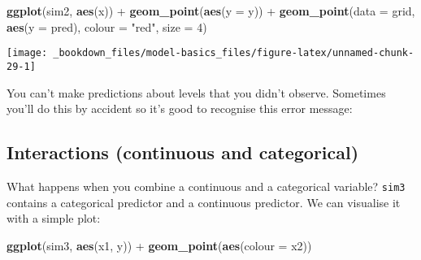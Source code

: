 \documentclass[]{book}
\newenvironment{Shaded}{\begin{snugshade}}{\end{snugshade}}
\newcommand{\KeywordTok}[1]{\textcolor[rgb]{0.13,0.29,0.53}{\textbf{{#1}}}}
\newcommand{\DataTypeTok}[1]{\textcolor[rgb]{0.13,0.29,0.53}{{#1}}}
\newcommand{\DecValTok}[1]{\textcolor[rgb]{0.00,0.00,0.81}{{#1}}}
\newcommand{\StringTok}[1]{\textcolor[rgb]{0.31,0.60,0.02}{{#1}}}
\newcommand{\CommentTok}[1]{\textcolor[rgb]{0.56,0.35,0.01}{\textit{{#1}}}}
\newcommand{\NormalTok}[1]{{#1}}
\begin{document}
\begin{Shaded}
\begin{Highlighting}[]
\KeywordTok{ggplot}\NormalTok{(sim2, }\KeywordTok{aes}\NormalTok{(x)) +}\StringTok{ }
\StringTok{  }\KeywordTok{geom_point}\NormalTok{(}\KeywordTok{aes}\NormalTok{(}\DataTypeTok{y =} \NormalTok{y)) +}
\StringTok{  }\KeywordTok{geom_point}\NormalTok{(}\DataTypeTok{data =} \NormalTok{grid, }\KeywordTok{aes}\NormalTok{(}\DataTypeTok{y =} \NormalTok{pred), }\DataTypeTok{colour =} \StringTok{"red"}\NormalTok{, }\DataTypeTok{size =} \DecValTok{4}\NormalTok{)}
\end{Highlighting}
\end{Shaded}

\begin{center}\texttt{[image: \_bookdown\_files/model-basics\_files/figure-latex/unnamed-chunk-29-1]} \end{center}

You can't make predictions about levels that you didn't observe.
Sometimes you'll do this by accident so it's good to recognise this
error message:

\begin{Shaded}
\end{Shaded}

\subsection{Interactions (continuous and
categorical)}\label{interactions-continuous-and-categorical}

What happens when you combine a continuous and a categorical variable?
\texttt{sim3} contains a categorical predictor and a continuous
predictor. We can visualise it with a simple plot:

\begin{Shaded}
\begin{Highlighting}[]
\KeywordTok{ggplot}\NormalTok{(sim3, }\KeywordTok{aes}\NormalTok{(x1, y)) +}\StringTok{ }
\StringTok{  }\KeywordTok{geom_point}\NormalTok{(}\KeywordTok{aes}\NormalTok{(}\DataTypeTok{colour =} \NormalTok{x2))}
\end{Highlighting}
\end{Shaded}
\end{document}
